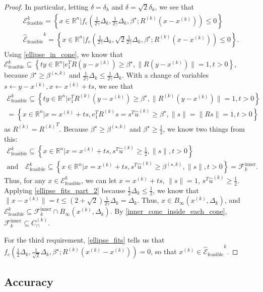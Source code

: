 \documentclass{article}
\theoremstyle{case}
\newcommand{\xk}{{x^{(k)}}}
\newcommand{\Rn}{\mathbb R^n}
\newcommand{\dk}{\Delta_k}
\newcommand{\sdk}{{\delta_k}}
\newcommand{\unshiftedellipsoid}{{\mathcal E^k_{\text{feasible}}}}
\newcommand{\scaledunshiftedellipsoid}{{{\mathcal {\hat E}_{\text{feasible}}}^k}}
\newcommand{\rotk}{{R^{(k)}}}
\newcommand{\huk}{{{\hat u}^{(k)}}}
\newcommand{\bsk}{{\beta^{(\star, k)}}}
\newcommand{\fcki}{{\mathcal {F}^{\text{inner}}_k}}
\newcommand{\capcones}{{C^{(k)}_{\cap}}}
\newcommand{\tr}{{ B_{\infty}\left(\xk, \dk\right) }}
\begin{document}
\begin{proof}
In particular, letting $\delta = \sdk$ and $\delta = \sqrt{2}\sdk$, we see that
\begin{align*}
\unshiftedellipsoid = \left\{x \in \Rn | f_e\left(\frac 1 {2\gamma} \dk, \frac 1 {2\gamma} \dk, \beta^{\star}; \rotk\left(x - \xk\right)\right) \le 0 \right\} \\
\scaledunshiftedellipsoid = \left\{x \in \Rn | f_e\left(\frac 1 {2\gamma} \dk, \sqrt{2} \frac {1}{2\gamma}\dk, \beta^{\star}; \rotk\left(x - \xk\right)\right) \le 0 \right\}.
\end{align*}
Using \cref{ellipse_in_cone}, we know that $\unshiftedellipsoid \subseteq \left\{t y \in \Rn | e_1^TR\left(y - \xk\right) \ge \beta^{\star}, \|R\left(y - \xk\right)\| = 1, t > 0 \right\}$,
because $\beta^{\star} \ge \bsk$ and $\frac 1 {2\gamma} \dk \le \frac 1 {2\gamma} \dk$.
With a change of variables $s \gets y - \xk, x \gets \xk + t s$, we see that
\begin{align*}
\unshiftedellipsoid \subseteq \left\{t y \in \Rn | e_1^T\rotk\left(y - \xk\right) \ge \beta^{\star}, \|\rotk\left(y - \xk\right)\| = 1, t > 0 \right\} \\
= \left\{x \in \Rn | x = \xk + ts, e_1^T\rotk s = s^T\huk \ge \beta^{\star}, \|s\| = \|Rs\| = 1, t > 0 \right\}
\end{align*}
as $\rotk = \rotk^T$.
Because $\beta^{\star} \ge \bsk$ and $\beta^{\star} \ge \frac 1 2$, we know two things from this:
\begin{align*}
\unshiftedellipsoid \subseteq \left\{x \in \Rn | x = \xk + ts, s^T\huk \ge \frac 1 2, \|s\|, t > 0 \right\} \\
\textrm{and} \quad \unshiftedellipsoid \subseteq \left\{x \in \Rn | x = \xk + ts, s^T\huk \ge \bsk, \|s\|, t > 0 \right\} = \fcki.
\end{align*}
Thus, for any $x \in \unshiftedellipsoid$, we can let $x = \xk + ts$, $\|s\| = 1$, $s^T\huk \ge \frac 1 2$.
Applying \cref{ellipse_fits_part_2} because $\frac 1 2 \dk \le \frac 1 2$, we know that $\|x - \xk\| = t \le \left(2 + \sqrt{2}\right)\frac 1 {2\gamma} \dk = \dk$.
Thus, $x \in \tr$, and $\unshiftedellipsoid \subseteq \fcki \cap \tr$.
By \cref{inner_cone_inside_each_cone}, $\fcki \subseteq \capcones$.

For the third requirement, \cref{ellipse_fits} tells us that
$f_e\left(\frac 1 2 \dk, \frac 1 {\sqrt{2}}\dk, \beta^{\star}; \rotk\left(\xk - \xk\right)\right) = 0$, so that $\xk \in \scaledunshiftedellipsoid$.
\end{proof}

\subsection{Accuracy}
\label{ellipsoidal_lambda}
\end{document}
